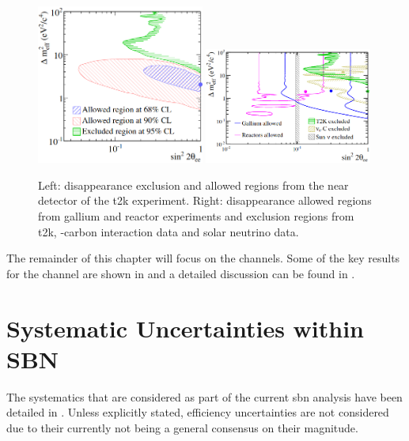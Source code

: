 \begin{figure}[!h]
    \centering
    \includegraphics[width = 0.49\textwidth, height = 0.35\textwidth]{figures-chap6/external_limits/nue_disapp_external_T2K.png}
    \includegraphics[width = 0.49\textwidth, height = 0.35\textwidth]{figures-chap6/external_limits/nue_dissap_external_combo.png}
    \caption[\nue disappearance limits from gallium and reactor experiments, the near detector of the  \gls{t2k} experiment and from \nue-carbon interaction data and solar neutrino data.]{Left: \nue disappearance exclusion and allowed regions from the near detector of the \gls{t2k} experiment. Right: \nue disappearance allowed regions from gallium and reactor experiments and exclusion regions from \gls{t2k}, \nue-carbon interaction data and solar neutrino data.}
    \label{fig:nue_disapp_external}
\end{figure}

\newpage
The remainder of this chapter will focus on the \nue channels. Some of the key results for the \numu channel are shown in  and a detailed discussion can be found in \cite{Rhiannon's_thesis}.


\newpage
\section{Systematic Uncertainties within SBN}

The systematics that are considered as part of the current \gls{sbn} analysis have been detailed in . Unless explicitly stated, efficiency uncertainties are not considered due to their currently not being a general consensus on their magnitude. 

